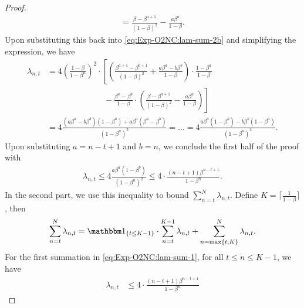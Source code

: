 \begin{proof}
\begin{align*}
    = \frac{\beta-\beta^{a+1}}{(1-\beta)^2} - \frac{a\beta^a}{1-\beta}.
\end{align*}
Upon substituting this back into \eqref{eq:Exp-O2NC:lam-sum-2b} and simplifying the expression, we have
\begin{align*}
    \lambda_{n,t}
    &= 4\left(\frac{1-\beta}{1-\beta^n}\right)^2 \cdot \left[
    \left( \frac{\beta^{a+1} - \beta^{b+1}}{(1-\beta)^2} + \frac{a\beta^{a}-b\beta^{b}}{1-\beta} \right) \cdot \frac{1-\beta^a}{1-\beta} \right. \\
    &\phantom{= 4\left(\frac{1-\beta}{1-\beta^n}\right)^2 \cdot }\ - \left. \frac{\beta^a-\beta^b}{1-\beta} \cdot \left(\frac{\beta-\beta^{a+1}}{(1-\beta)^2} - \frac{a\beta^a}{1-\beta}\right)
    \right] \\
    &= 4\frac{(a\beta^a-b\beta^b)(1-\beta^a) + a\beta^a(\beta^a-\beta^b)}{(1-\beta^n)^2} 
    = \ldots 
    = 4\frac{a\beta^a(1-\beta^b) - b\beta^b(1-\beta^a)}{(1-\beta^n)^2}.
\end{align*}
Upon substituting $a=n-t+1$ and $b=n$, we conclude the first half of the proof with 
\begin{align*}
    \lambda_{n,t} 
    \le 4\frac{a\beta^a(1-\beta^b)}{(1-\beta^n)^2}
    \le 4\cdot \frac{(n-t+1)\beta^{n-t+1}}{1-\beta^n}.
\end{align*}
In the second part, we use this inequality to bound $\sum_{n=t}^N\lambda_{n,t}$. Define $K=\lceil \frac{1}{1-\beta}\rceil$, then
\begin{align}
    \sum_{n=t}^N \lambda_{n,t}
    = \one_{\{t\le K-1\}}\cdot \sum_{n=t}^{K-1} \lambda_{n,t} + \sum_{n=\max\{t,K\}}^N \lambda_{n,t}.
    \label{eq:Exp-O2NC:lam-sum-1}
\end{align}
For the first summation in \eqref{eq:Exp-O2NC:lam-sum-1}, for all $t\le n\le K-1$, we have
\begin{align*}
    \lambda_{n,t}
    &\le 4\cdot \frac{(n-t+1)\beta^{n-t+1}}{1-\beta^n} 

\end{align*}
\end{proof}
